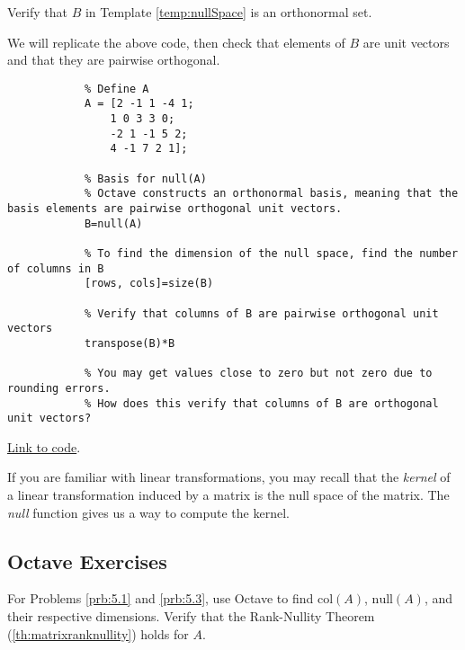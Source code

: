 \documentclass{ximera}
\begin{document}
\begin{example}\label{ex_oct_orth}
    Verify that $B$ in Template \ref{temp:nullSpace} is an orthonormal set.
    \begin{explanation}
    We will replicate the above code, then check that elements of $B$ are unit vectors and that they are pairwise orthogonal.
        \begin{verbatim}
            % Define A
            A = [2 -1 1 -4 1;
                1 0 3 3 0;
                -2 1 -1 5 2;
                4 -1 7 2 1];

            % Basis for null(A)
            % Octave constructs an orthonormal basis, meaning that the basis elements are pairwise orthogonal unit vectors.
            B=null(A)

            % To find the dimension of the null space, find the number of columns in B
            [rows, cols]=size(B)

            % Verify that columns of B are pairwise orthogonal unit vectors
            transpose(B)*B

            % You may get values close to zero but not zero due to rounding errors.
            % How does this verify that columns of B are orthogonal unit vectors?
        \end{verbatim}

    \href{https://sagecell.sagemath.org/?z=eJyNUE1rwkAQvQfyH95FsEWLsZYeihRDD731UgpFPKzJRBeSGdkPRX99Z41tTy3uwsK8ee_N2xnghRrLhEWeLTDHcopxgQLjGYqnPIOeAhPc651c6vE09Qs8YHpBZql8hOIrRfJsgNJ469GIA8e2HS5uEvhWBbMnVMI-uFgFD8MQF7bC4jrTYp1UI3Rk2PIGYWuCPtTjoJY64qRyhJ2x7mA99fqNsMoj24A9VUGcv8uzcv4zO01_F-hH67NhbdXJW9HxzRlITPidqWj0y-LYrcklSiVt7NjDMso8Wzo5aEwF_Wru7YmG5WXGBznbHPvg3xqVl1dFzrPgDPud-GR4W_aWnxLRmSM2pETTRvKoWqUgCE7kBOsYwBL6oo7nhpPIdVohOdcvY4BXOaAWlYetLnP_X9I_Aj5_AYgZsTc=&lang=octave&interacts=eJyLjgUAARUAuQ==}{Link to code}.
    \end{explanation}
\end{example}

If you are familiar with linear transformations, you may recall that the \emph{kernel} of a linear transformation induced by a matrix is the null space of the matrix.  The \emph{null} function gives us a way to compute the kernel.

\subsection*{Octave Exercises}
For Problems \ref{prb:5.1} and \ref{prb:5.3}, use Octave to find $\text{col}(A)$, $\text{null}(A)$, and their respective dimensions.  Verify that the Rank-Nullity Theorem (\ref{th:matrixranknullity}) holds for $A$.
\end{document}
